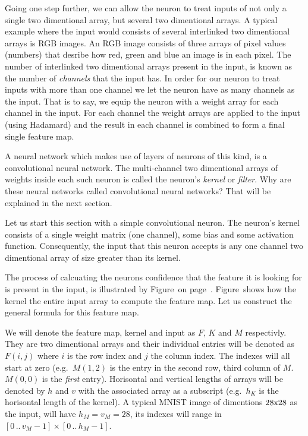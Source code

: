 Going one step further, we can allow the neuron to treat inputs of not only a single two dimentional array, but several two dimentional arrays.
A typical example where the input would consists of several interlinked two dimentional arrays is RGB images.
An RGB image consists of three arrays of pixel values (numbers) that desribe how red, green and blue an image is in each pixel.
The number of interlinked two dimentional arrays present in the input, is known as the number of {\em channels} that the input has.
In order for our neuron to treat inputs with more than one channel we let the neuron have as many channels as the input.
That is to say, we equip the neuron with a weight array for each channel in the input.
For each channel the weight arrays are applied to the input (using Hadamard) and the result in each channel is combined to form a final single feature map.

A neural network which makes use of layers of neurons of this kind, is a convolutional neural network.
The multi-channel two dimentional arrays of weights inside each such neuron is called the neuron's {\em kernel} or {\em filter}.
Why are these neural networks called convolutional neural networks?
That will be explained in the next section.

\startsubsection[title=The convolutional neuron]
Let us start this section with a simple convolutional neuron.
The neuron's kernel consists of a single weight matrix (one channel), some bias and some activation function.
Consequently, the input that this neuron accepts is any one channel two dimentional array of size greater than its kernel.

The process of calcuating the neurons  confidence that the feature it is looking for is present in the input, is illustrated by Figure~ on page~.
Figure~ shows how the kernel  the entire input array to compute the feature map.
Let us construct the general formula for this feature map.

We will denote the feature map, kernel and input as $F$, $K$ and $M$ respectivly.
They are two dimentional arrays and their individual entries will be denoted as $F(i,j)$ where $i$ is the row index and $j$ the column index.
The indexes will all start at zero (e.g.\ $M(1,2)$ is the entry in the second row, third column of $M$. $M(0,0)$ is the {\em first} entry).
Horisontal and vertical lengths of arrays will be denoted by $h$ and $v$ with the associated array as a subscript (e.g.\ $h_K$ is the horisontal length of the kernel).
A typical MNIST image of dimentions $28{\rm x}28$ as the input, will have $h_M = v_M = 28$, its indexes will range in $[0 \, .. \, v_M - 1] \times [0 \, .. \, h_M - 1]$.

